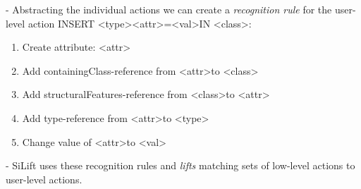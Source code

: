 \documentclass[10pt,a4paper,oneside]{scrartcl}
\begin{document}
- Abstracting the individual actions we can create a \textit{recognition rule} for the user-level action INSERT \textless type\textgreater \textless attr\textgreater=\textless val\textgreater IN \textless class\textgreater :
\begin{enumerate}
	\item Create attribute: \textless attr\textgreater
	\item Add containingClass-reference from \textless attr\textgreater to \textless class\textgreater
	\item Add structuralFeatures-reference from \textless class\textgreater to \textless attr\textgreater
	\item Add type-reference from \textless attr\textgreater to \textless type\textgreater
	\item Change value of \textless attr\textgreater to \textless val\textgreater
\end{enumerate}
- SiLift uses these recognition rules and \textit{lifts} matching sets of low-level actions to user-level actions.
\\
\end{document}
